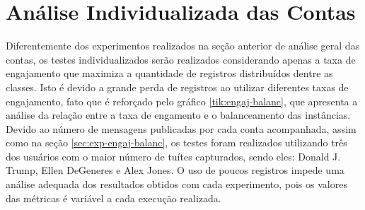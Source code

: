 \documentclass[oneside,openright,12pt]{ufsm_2015} %
\begin{document}

\section{Análise Individualizada das Contas}
\label{sec:exp-individual}

    \par Diferentemente dos experimentos realizados na seção anterior de análise geral das contas, os testes individualizados serão realizados considerando apenas a taxa de engajamento que maximiza a quantidade de registros distribuídos dentre as classes. Isto é devido a grande perda de registros ao utilizar diferentes taxas de engajamento, fato que é reforçado pelo gráfico \ref{tik:engaj-balanc}, que apresenta a análise da relação entre a taxa de engamento e o balanceamento das instâncias. Devido ao número de mensagens publicadas por cada conta acompanhada, assim como na seção \ref{sec:exp-engaj-balanc}, os testes foram realizados utilizando três dos usuários com o maior número de tuítes capturados, sendo eles: Donald J. Trump, Ellen DeGeneres e Alex Jones. O uso de poucos registros impede uma análise adequada dos resultados obtidos com cada experimento, pois os valores das métricas é variável a cada execução realizada.
    
    \mydata
    
\end{document}
